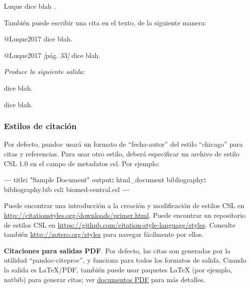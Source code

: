 \documentclass[12pt,a4paper,oneside,]{article}
\newenvironment{Shaded}{\begin{snugshade}}{\end{snugshade}}
\newcommand{\AttributeTok}[1]{\textcolor[rgb]{0.77,0.63,0.00}{#1}}
\newcommand{\CommentTok}[1]{\textcolor[rgb]{0.56,0.35,0.01}{\textit{#1}}}
\newcommand{\FunctionTok}[1]{\textcolor[rgb]{0.00,0.00,0.00}{#1}}
\newcommand{\KeywordTok}[1]{\textcolor[rgb]{0.13,0.29,0.53}{\textbf{#1}}}
\newcommand{\NormalTok}[1]{#1}
\newcommand{\OtherTok}[1]{\textcolor[rgb]{0.56,0.35,0.01}{#1}}
\newcommand{\PreprocessorTok}[1]{\textcolor[rgb]{0.56,0.35,0.01}{\textit{#1}}}
\newcommand{\StringTok}[1]{\textcolor[rgb]{0.31,0.60,0.02}{#1}}
\numberwithin{dummy}{section}
\theoremstyle{ocrenumbox}
\theoremstyle{blacknumex}
\theoremstyle{blacknumbox}
\theoremstyle{ocrenum}
\theoremstyle{ocrenum}
\begin{document}
Luque dice blah \citeyearpar{Luque2017}.

También puede escribir una cita en el texto, de la siguiente manera:

\begin{Shaded}
\begin{Highlighting}[]
\NormalTok{@Luque2017 dice blah.}

\NormalTok{@Luque2017 }\CommentTok{[}\OtherTok{pág. 33}\CommentTok{]}\NormalTok{ dice blah.}
\end{Highlighting}
\end{Shaded}

\emph{Produce la siguiente salida:}

\citet{Luque2017} dice blah.

\citet[pág. 33]{Luque2017} dice blah.

\hypertarget{estilos-de-citaciuxf3n}{%
\subsubsection{Estilos de citación}\label{estilos-de-citaciuxf3n}}

Por defecto, pandoc usará un formato de ``fecha-autor'' del estilo
``chicago'' para citas y referencias. Para usar otro estilo, deberá
especificar un archivo de estilo CSL 1.0 en el campo de metadatos csl.
Por ejemplo:

\begin{Shaded}
\begin{Highlighting}[]
\PreprocessorTok{{-}{-}{-}}
\FunctionTok{title}\KeywordTok{:}\AttributeTok{ }\StringTok{"Sample Document"}
\FunctionTok{output}\KeywordTok{:}\AttributeTok{ html\_document}
\FunctionTok{bibliography}\KeywordTok{:}\AttributeTok{ bibliography.bib}
\FunctionTok{csl}\KeywordTok{:}\AttributeTok{ biomed{-}central.csl}
\PreprocessorTok{{-}{-}{-}}
\end{Highlighting}
\end{Shaded}

Puede encontrar una introducción a la creación y modificación de estilos
CSL en \url{http://citationstyles.org/downloads/primer.html}. Puede
encontrar un repositorio de estilos CSL en
\url{https://github.com/citation-style-language/styles}. Consulte
también \url{http://zotero.org/styles} para navegar fácilmente por
ellos.

\textbf{Citaciones para salidas PDF}. Por defecto, las citas son
generadas por la utilidad ``pandoc-citeproc'', y funciona para todos los
formatos de salida. Cuando la salida es LaTeX/PDF, también puede usar
paquetes LaTeX (por ejemplo, natbib) para generar citas; ver
\href{https://bookdown.org/yihui/rmarkdown/pdf-document.html}{documentos
PDF} para más detalles.
\end{document}
